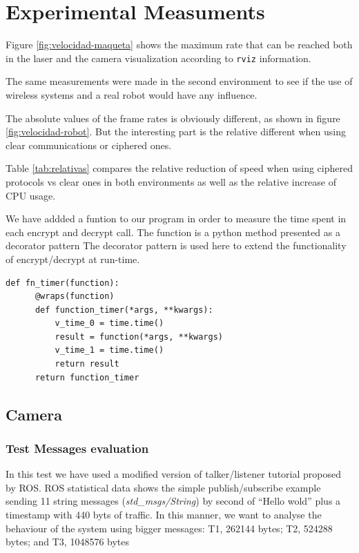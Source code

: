 \documentclass[journal,twoside]{JoPhA}
\begin{document}
\section{Experimental Measuments}

Figure \ref{fig:velocidad-maqueta} shows the maximum rate that can be reached both in the laser and the camera visualization according to \texttt{rviz} information.

The same measurements were made in the second environment to see if the use of wireless systems and a real robot would have any influence.

The absolute values of the frame rates is obviously different, as shown in figure \ref{fig:velocidad-robot}. But the interesting part is the relative different when using clear communications or ciphered ones. 

Table \ref{tab:relativas}  compares the relative reduction of speed when using ciphered protocols vs clear ones in both environments as well as the relative increase of CPU usage.

We have addded a funtion to our program in order to measure the time spent in each encrypt and decrypt call. The function is a python method presented as a decorator pattern 
The decorator pattern is used here to extend the functionality of encrypt/decrypt at run-time. 


{
  \footnotesize{
    \begin{Verbatim}[frame=single]
def fn_timer(function):
	  @wraps(function)
	  def function_timer(*args, **kwargs):
	      v_time_0 = time.time()
	      result = function(*args, **kwargs)
	      v_time_1 = time.time()
	      return result
	  return function_timer
    \end{Verbatim}
  }
}


\subsection{Camera}

\subsubsection{Test Messages evaluation}

In this test we have used a modified version of talker/listener tutorial proposed by ROS. 
ROS statistical data shows the simple publish/subscribe example sending 11 string messages ({\em std\_msgs/String}) by second of ``Hello wold'' plus a timestamp with 440 byts of traffic.
In this manner, we want to analyse the behaviour of the system using bigger messages: T1, 262144 bytes; T2,  524288 bytes; and T3, 1048576 bytes 
\end{document}
